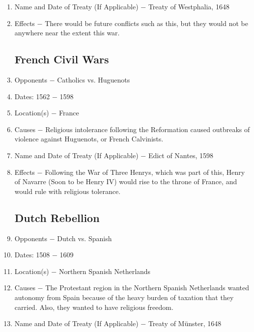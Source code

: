 \documentclass[12pt]{article}
\begin{document}
\begin{enumerate}
\item Name and Date of Treaty (If Applicable) $-$ Treaty of Westphalia, 1648

\item Effects $-$ There would be future conflicts such as this, but they would not be anywhere near the extent this war. 

\subsection{French Civil Wars}
 
\item Opponents $-$ Catholics vs. Huguenots

\item Dates: 1562 $-$ 1598

\item Location(s) $-$ France

\item Causes $-$ Religious intolerance following the Reformation caused outbreaks of violence against Huguenots, or French Calvinists.

\item Name and Date of Treaty (If Applicable) $-$ Edict of Nantes, 1598

\item Effects $-$ Following the War of Three Henrys, which was part of this, Henry of Navarre (Soon to be Henry IV) would rise to the throne of France, and would rule with religious tolerance. 

\subsection{Dutch Rebellion}

\item Opponents $-$ Dutch vs. Spanish

\item Dates: 1508 $-$ 1609

\item Location(s) $-$ Northern Spanish Netherlands

\item Causes $-$ The Protestant region in the Northern Spanish Netherlands wanted autonomy from Spain because of the heavy burden of taxation that they carried. Also, they wanted to have religious freedom. 

\item Name and Date of Treaty (If Applicable) $-$ Treaty of M\"unster, 1648


\end{enumerate}
\end{document}
